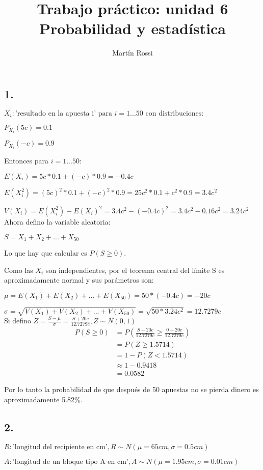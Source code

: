 \documentclass[12pt,fleqn]{article}
\title{\LARGE \textbf{Trabajo práctico: unidad 6}\\\large Probabilidad y estadística}
\author{Martín Rossi}
\date{}
\begin{document}
\maketitle
\subsection*{1.}
$X_i: \textrm{'resultado en la apuesta i' para } i=1...50 \textrm{ con distribuciones:}$

$P_{X_i}(5c)=0.1$

$P_{X_i}(-c)=0.9$

Entonces para $i=1...50$:

$E(X_i)=5c*0.1+(-c)*0.9=-0.4c$

$E(X_i^2)=(5c)^2*0.1+(-c)^2*0.9=25c^2*0.1+c^2*0.9=3.4c^2$

$V(X_i)=E(X_i^2)-E(X_i)^2=3.4c^2-(-0.4c)^2=3.4c^2-0.16c^2=3.24c^2$\\

Ahora defino la variable aleatoria:

$S=X_1+X_2+...+X_{50}$

Lo que hay que calcular es $P(S \ge 0)$.

Como las $X_i$ son independientes, por el teorema central del límite S es aproximadamente normal y sus parámetros son:

$\mu=E(X_1)+E(X_2)+...+E(X_{50})=50*(-0.4c)=-20c$

$\sigma=\sqrt{V(X_1)+V(X_2)+...+V(X_{50})}=\sqrt{50*3.24c^2}=12.7279c$\\

Si defino $Z=\frac{S-\mu}{\sigma}=\frac{S+20c}{12.7279c}, Z \sim N(0,1)$
\begin{align*}
  P(S \ge 0)&=P(\frac{S+20c}{12.7279c}\ge\frac{0+20c}{12.7279c})\\
            &=P(Z\ge 1.5714)\\
            &=1-P(Z<1.5714)\\
            &\approx 1-0.9418\\
            &=0.0582
\end{align*}

Por lo tanto la probabilidad de que después de 50 apuestas no se pierda dinero es aproximadamente 5.82\%.
\newpage
\subsection*{2.}
$R: \textrm{'longitud del recipiente en cm'}, R \sim N(\mu=65cm,\sigma=0.5cm)$

$A: \textrm{'longitud de un bloque tipo A en cm'}, A \sim N(\mu=1.95cm,\sigma=0.01cm)$
\end{document}

